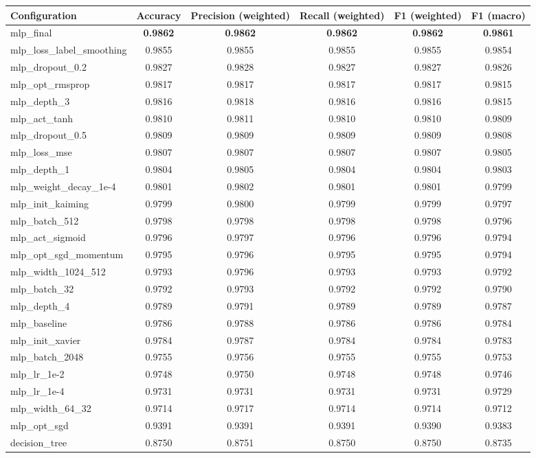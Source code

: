 \begin{tabular}{lccccc}
\hline
Configuration & Accuracy & Precision (weighted) & Recall (weighted) & F1 (weighted) & F1 (macro) \\
\hline
mlp\_final & \textbf{0.9862} & \textbf{0.9862} & \textbf{0.9862} & \textbf{0.9862} & \textbf{0.9861} \\
mlp\_loss\_label\_smoothing & 0.9855 & 0.9855 & 0.9855 & 0.9855 & 0.9854 \\
mlp\_dropout\_0.2 & 0.9827 & 0.9828 & 0.9827 & 0.9827 & 0.9826 \\
mlp\_opt\_rmsprop & 0.9817 & 0.9817 & 0.9817 & 0.9817 & 0.9815 \\
mlp\_depth\_3 & 0.9816 & 0.9818 & 0.9816 & 0.9816 & 0.9815 \\
mlp\_act\_tanh & 0.9810 & 0.9811 & 0.9810 & 0.9810 & 0.9809 \\
mlp\_dropout\_0.5 & 0.9809 & 0.9809 & 0.9809 & 0.9809 & 0.9808 \\
mlp\_loss\_mse & 0.9807 & 0.9807 & 0.9807 & 0.9807 & 0.9805 \\
mlp\_depth\_1 & 0.9804 & 0.9805 & 0.9804 & 0.9804 & 0.9803 \\
mlp\_weight\_decay\_1e-4 & 0.9801 & 0.9802 & 0.9801 & 0.9801 & 0.9799 \\
mlp\_init\_kaiming & 0.9799 & 0.9800 & 0.9799 & 0.9799 & 0.9797 \\
mlp\_batch\_512 & 0.9798 & 0.9798 & 0.9798 & 0.9798 & 0.9796 \\
mlp\_act\_sigmoid & 0.9796 & 0.9797 & 0.9796 & 0.9796 & 0.9794 \\
mlp\_opt\_sgd\_momentum & 0.9795 & 0.9796 & 0.9795 & 0.9795 & 0.9794 \\
mlp\_width\_1024\_512 & 0.9793 & 0.9796 & 0.9793 & 0.9793 & 0.9792 \\
mlp\_batch\_32 & 0.9792 & 0.9793 & 0.9792 & 0.9792 & 0.9790 \\
mlp\_depth\_4 & 0.9789 & 0.9791 & 0.9789 & 0.9789 & 0.9787 \\
mlp\_baseline & 0.9786 & 0.9788 & 0.9786 & 0.9786 & 0.9784 \\
mlp\_init\_xavier & 0.9784 & 0.9787 & 0.9784 & 0.9784 & 0.9783 \\
mlp\_batch\_2048 & 0.9755 & 0.9756 & 0.9755 & 0.9755 & 0.9753 \\
mlp\_lr\_1e-2 & 0.9748 & 0.9750 & 0.9748 & 0.9748 & 0.9746 \\
mlp\_lr\_1e-4 & 0.9731 & 0.9731 & 0.9731 & 0.9731 & 0.9729 \\
mlp\_width\_64\_32 & 0.9714 & 0.9717 & 0.9714 & 0.9714 & 0.9712 \\
mlp\_opt\_sgd & 0.9391 & 0.9391 & 0.9391 & 0.9390 & 0.9383 \\
decision\_tree & 0.8750 & 0.8751 & 0.8750 & 0.8750 & 0.8735 \\
\hline
\end{tabular}
